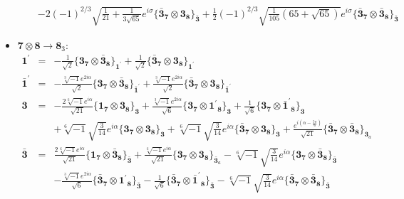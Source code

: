 \documentclass[english]{article}
\newcommand{\subcg}[3]{\big\{ {#1}\otimes{#2}\big\}^{}_{#3}}
\newcommand{\rep}[1]{\mathbf{#1}}
\begin{document}
\begin{itemize}
\begin{eqnarray*}
 & & -2 (-1)^{2/3} \sqrt{\frac{1}{21}+\frac{1}{3 \sqrt{65}}} e^{i \sigma }\subcg{\rep{\bar{3}}_{\rep{7}}}{\rep{3}_{\rep{8}}}{\rep{\bar{3}}}+\frac{1}{2} (-1)^{2/3} \sqrt{\frac{1}{105} \left(65+\sqrt{65}\right)} e^{i \sigma }\subcg{\rep{\bar{3}}_{\rep{7}}}{\rep{\bar{3}}_{\rep{8}}}{\rep{\bar{3}}}
\end{eqnarray*}
\item $\rep{7}\otimes\rep{8}\to\rep{8}_{3}$:
\begin{eqnarray*}
\rep{1^{\prime}} &=& -\frac{1}{\sqrt{2}}\subcg{\rep{3}_{\rep{7}}}{\rep{\bar{3}}_{\rep{8}}}{\rep{1^{\prime}}}+\frac{1}{\sqrt{2}}\subcg{\rep{\bar{3}}_{\rep{7}}}{\rep{3}_{\rep{8}}}{\rep{1^{\prime}}}
\\
\rep{\bar{1}^{\prime}} &=& -\frac{\sqrt[3]{-1} e^{2 i \alpha }}{\sqrt{2}}\subcg{\rep{3}_{\rep{7}}}{\rep{\bar{3}}_{\rep{8}}}{\rep{\bar{1}^{\prime}}}+\frac{\sqrt[3]{-1} e^{2 i \alpha }}{\sqrt{2}}\subcg{\rep{\bar{3}}_{\rep{7}}}{\rep{3}_{\rep{8}}}{\rep{\bar{1}^{\prime}}}
\\
\rep{3} &=& -\frac{2 \sqrt[6]{-1} e^{i \alpha }}{\sqrt{21}}\subcg{\rep{1}_{\rep{7}}}{\rep{3}_{\rep{8}}}{\rep{3}}+\frac{\sqrt[3]{-1} e^{2 i \alpha }}{\sqrt{6}}\subcg{\rep{3}_{\rep{7}}}{\rep{1^{\prime}}_{\rep{8}}}{\rep{3}}+\frac{1}{\sqrt{6}}\subcg{\rep{3}_{\rep{7}}}{\rep{\bar{1}^{\prime}}_{\rep{8}}}{\rep{3}} \\ 
 & & +\sqrt[6]{-1} \sqrt{\frac{3}{14}} e^{i \alpha }\subcg{\rep{3}_{\rep{7}}}{\rep{3}_{\rep{8}}}{\rep{3}}+\sqrt[6]{-1} \sqrt{\frac{3}{14}} e^{i \alpha }\subcg{\rep{\bar{3}}_{\rep{7}}}{\rep{3}_{\rep{8}}}{\rep{3}}+\frac{e^{i \left(\alpha -\frac{5 \pi }{6}\right)}}{\sqrt{21}}\subcg{\rep{\bar{3}}_{\rep{7}}}{\rep{\bar{3}}_{\rep{8}}}{\rep{3}_{a}}
\\
\rep{\bar{3}} &=& \frac{2 \sqrt[6]{-1} e^{i \alpha }}{\sqrt{21}}\subcg{\rep{1}_{\rep{7}}}{\rep{\bar{3}}_{\rep{8}}}{\rep{\bar{3}}}+\frac{\sqrt[6]{-1} e^{i \alpha }}{\sqrt{21}}\subcg{\rep{3}_{\rep{7}}}{\rep{3}_{\rep{8}}}{\rep{\bar{3}}_{a}}-\sqrt[6]{-1} \sqrt{\frac{3}{14}} e^{i \alpha }\subcg{\rep{3}_{\rep{7}}}{\rep{\bar{3}}_{\rep{8}}}{\rep{\bar{3}}} \\ 
 & & -\frac{\sqrt[3]{-1} e^{2 i \alpha }}{\sqrt{6}}\subcg{\rep{\bar{3}}_{\rep{7}}}{\rep{1^{\prime}}_{\rep{8}}}{\rep{\bar{3}}}-\frac{1}{\sqrt{6}}\subcg{\rep{\bar{3}}_{\rep{7}}}{\rep{\bar{1}^{\prime}}_{\rep{8}}}{\rep{\bar{3}}}-\sqrt[6]{-1} \sqrt{\frac{3}{14}} e^{i \alpha }\subcg{\rep{\bar{3}}_{\rep{7}}}{\rep{\bar{3}}_{\rep{8}}}{\rep{\bar{3}}}
\end{eqnarray*}
\end{itemize}
\end{document}
